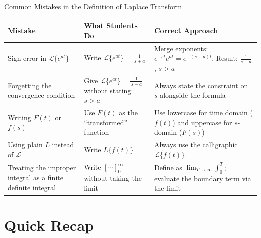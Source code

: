 \documentclass[12pt,a4paper]{article}
\begin{document}
\begin{mistakebox}{Common Mistakes in the Definition of Laplace Transform}
\begin{center}
\begin{tabular}{@{}p{4.5cm} p{4.5cm} p{5cm}@{}}
\toprule
\textbf{Mistake} & \textbf{What Students Do} & \textbf{Correct Approach} \\
\midrule
Sign error in $\mathcal{L}\{e^{at}\}$
  & Write $\mathcal{L}\{e^{at}\} = \frac{1}{s+a}$
  & Merge exponents: $e^{-st} e^{at} = e^{-(s-a)t}$.
    Result: $\frac{1}{s-a}$, \; $s > a$ \\[6pt]
Forgetting the convergence condition
  & Give $\mathcal{L}\{e^{at}\} = \frac{1}{s-a}$ without stating $s > a$
  & Always state the constraint on $s$ alongside the formula \\[6pt]
Writing $F(t)$ or $f(s)$
  & Use $F(t)$ as the ``transformed'' function
  & Use lowercase for time domain ($f(t)$) and uppercase for $s$-domain ($F(s)$) \\[6pt]
Using plain $L$ instead of $\mathcal{L}$
  & Write $L\{f(t)\}$
  & Always use the calligraphic $\mathcal{L}\{f(t)\}$ \\[6pt]
Treating the improper integral as a finite definite integral
  & Write $\left[\cdots\right]_0^{\infty}$ without taking the limit
  & Define as $\lim_{T\to\infty}\int_0^T$; evaluate the boundary term via the limit \\
\bottomrule
\end{tabular}
\end{center}
\end{mistakebox}

\section{Quick Recap}
\end{document}

